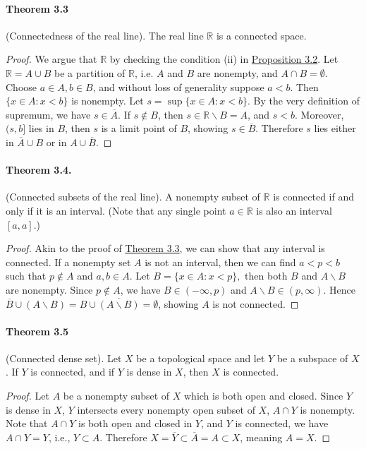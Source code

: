 \documentclass{article}
\numberwithin{equation}{section}
\theoremstyle{plain}
\theoremstyle{definition}
\begin{document}
\paragraph{Theorem 3.3\label{thm:3.3}} (Connectedness of the real line). The real line $\mathbb{R}$ is a connected space.
\begin{proof}
We argue that $\mathbb{R}$ by checking the condition (ii) in \hyperref[prop:3.2]{Proposition 3.2}.
Let $\mathbb{R}=A\cup B$ be a partition of $\mathbb{R}$, i.e. $A$ and $B$ are nonempty, and $A\cap B=\emptyset$. Choose $a\in A, b\in B$, and without loss of generality suppose $a < b$. Then $\{x\in A:x<b\}$ is nonempty. Let $s = \sup\{x\in A: x< b\}$. By the very definition of supremum, we have $s\in\overline{A}$. If $s\notin B$, then $s\in \mathbb{R}\backslash B = A$, and $s<b$. Moreover, $(s,b]$ lies in $B$, then $s$ is a limit point of $B$, showing $s\in\overline{B}$. Therefore $s$ lies either in $\overline{A}\cup B$ or in $A\cup\overline{B}$.
\end{proof}

\paragraph{Theorem 3.4.\label{thm:3.4}} (Connected subsets of the real line). A nonempty subset of $\mathbb{R}$ is connected if and only if it is an interval. (Note that any single point $a\in\mathbb{R}$ is also an interval $[a,a]$.)
\begin{proof}
Akin to the proof of \hyperref[thm:3.3]{Theorem 3.3}, we can show that any interval is connected. If a nonempty set $A$ is not an interval, then we can find $a<p<b$ such that $p\notin A$ and $a,b\in A$. Let $B=\{x\in A:x<p\},$ then both $B$ and $A\backslash B$ are nonempty. Since $p\notin A$, we have $B\in(-\infty,p)$ and $A\backslash B\in (p,\infty)$. Hence $\overline{B}\cup (A\backslash B) = B\cup\overline{(A\backslash B)} = \emptyset$, showing $A$ is not connected.
\end{proof}

\paragraph{Theorem 3.5\label{thm:3.5}} (Connected dense set). Let $X$ be a topological space and let $Y$ be a subspace of $X$. If $Y$ is connected, and if $Y$ is dense in $X$, then $X$ is connected. 
\begin{proof}
Let $A$ be a nonempty subset of $X$ which is both open and closed. Since 
$Y$ is dense in $X$, $Y$ intersects every nonempty open subset of 
$X$, $A\cap Y$ is nonempty. Note that $A\cap Y$ is both open and closed in $Y$, and $Y$ is connected, we have $A\cap Y = Y$, i.e., $Y\subset A$. Therefore $X = \overline{Y}\subset\overline{A} = A\subset X$, meaning $A=X$.
\end{proof}
\end{document}
